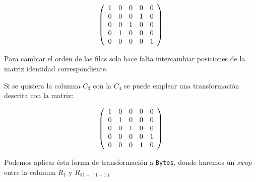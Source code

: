 \documentclass[a4paper]{article}
\newcommand*{\Scale}[2][4]{\scalebox{#1}{$#2$}}%
\begin{document}
 \[
\Scale[1]{
\left(
\begin{array}{ccccc}
 1 & 0 & 0 & 0 & 0 \\
 0 & 0 & 0 & 1 & 0 \\
 0 & 0 & 1 & 0 & 0 \\
 0 & 1 & 0 & 0 & 0 \\
 0 & 0 & 0 & 0 & 1
\end{array}
\right)
}
\]

Para cambiar el orden de las filas solo hace falta intercambiar posiciones de la matriz identidad correspondiente.

Si se quisiera la columna $C_3$ con la $C_4$ se puede emplear una transformación descrita con la matriz:

 \[
\Scale[1]{
\left(
\begin{array}{ccccc}
 1 & 0 & 0 & 0 & 0 \\
 0 & 1 & 0 & 0 & 0 \\
 0 & 0 & 1 & 0 & 0 \\
 0 & 0 & 0 & 0 & 1 \\
 0 & 0 & 0 & 1 & 0
\end{array}
\right)
}
\]

Podemos aplicar ésta forma de transformación a \texttt{Bytes}, donde haremos un \textit{swap} entre la columna $R_1$ y $R_{31-(1-1)}$
\end{document}
